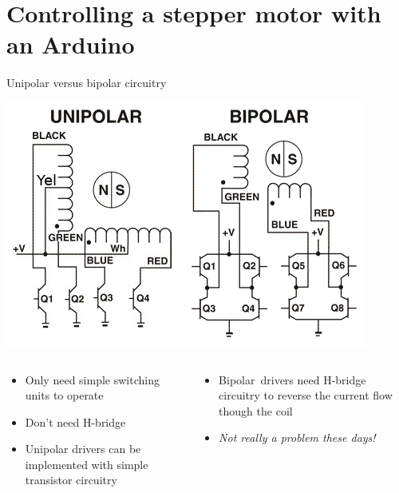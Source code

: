 \documentclass[compress]{beamer}
\begin{document}
\section{Controlling a stepper motor with an Arduino}

\begin{frame}{Unipolar versus bipolar circuitry}

    \begin{center}
        \includegraphics[width=0.6\linewidth]{wiring}
    \end{center}

    \small
    \begin{columns}
        \begin{column}{0.6\linewidth}
            \begin{itemize}
                \item Only need simple switching units to operate
                \item Don’t need H-bridge
                \item Unipolar drivers can be implemented with simple transistor circuitry
            \end{itemize}
        \end{column}
        \begin{column}{0.5\linewidth}
            \begin{itemize}
                \item Bipolar drivers need H-bridge circuitry to reverse the current flow though the coil
                \item \emph{Not really a problem these days!}
            \end{itemize}
        \end{column}
    \end{columns}
\end{frame}
\end{document}
